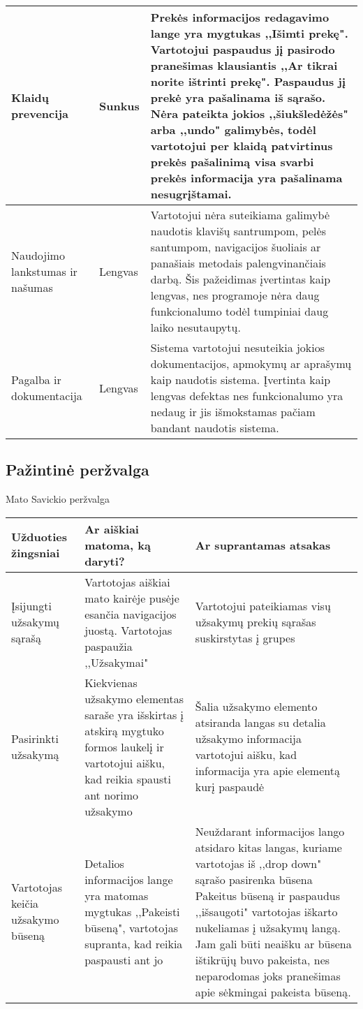 \documentclass[oneside]{VUMIFPSkursinis}
\begin{document}
\begin{center}
    \begin{tabular}{ |p{3cm}| p{3cm} | p{11cm} | }
	\hline
	Klaidų prevencija & Sunkus & Prekės informacijos redagavimo lange yra mygtukas ,,Išimti prekę". 
					Vartotojui paspaudus jį pasirodo pranešimas klausiantis ,,Ar tikrai norite ištrinti prekę". 
					Paspaudus jį prekė yra pašalinama iš sąrašo.
					Nėra pateikta jokios ,,šiukšledėžės" arba ,,undo" galimybės, todėl vartotojui per klaidą patvirtinus prekės pašalinimą visa svarbi prekės informacija yra pašalinama nesugrįštamai. \\ \hline
	Naudojimo lankstumas ir našumas & Lengvas & Vartotojui nėra suteikiama galimybė naudotis klavišų santrumpom, pelės santumpom, navigacijos šuoliais ar panašiais metodais palengvinančiais darbą.
								Šis pažeidimas įvertintas kaip lengvas, nes programoje nėra daug funkcionalumo todėl tumpiniai daug laiko nesutaupytų. \\ \hline
	Pagalba ir dokumentacija & Lengvas & Sistema vartotojui nesuteikia jokios dokumentacijos, apmokymų ar aprašymų kaip naudotis sistema. 
							Įvertinta kaip lengvas defektas nes funkcionalumo yra nedaug ir jis išmokstamas pačiam bandant naudotis sistema. \\ \hline
   \hline
    \end{tabular}
\end{center}
	\subsection{Pažintinė peržvalga}
Mato Savickio peržvalga
\begin{center}
    \begin{tabular}{ |p{4cm}| p{6cm} | p{7cm} | }
    \hline
    	Užduoties žingsniai & Ar aiškiai matoma, ką daryti? & Ar suprantamas atsakas \\ \hline 
	Įsijungti užsakymų sąrašą & Vartotojas aiškiai mato kairėje pusėje esančia navigacijos juostą.
					Vartotojas paspaužia ,,Užsakymai" & Vartotojui pateikiamas visų užsakymų prekių sąrašas suskirstytas į grupes \\ \hline
	Pasirinkti užsakymą & Kiekvienas užsakymo elementas saraše yra išskirtas į atskirą mygtuko formos laukelį ir vartotojui aišku, kad reikia spausti ant norimo užsakymo & Šalia užsakymo elemento atsiranda langas su detalia užsakymo informacija vartotojui aišku, kad informacija yra apie elementą kurį paspaudė \\ \hline
	Vartotojas keičia užsakymo būseną & Detalios informacijos lange yra matomas mygtukas ,,Pakeisti būseną", vartotojas supranta, kad reikia paspausti ant jo & Neuždarant informacijos lango atsidaro kitas langas, kuriame vartotojas iš ,,drop down" sąrašo pasirenka būsena  Pakeitus būseną ir paspaudus ,,išsaugoti" vartotojas iškarto nukeliamas į užsakymų langą.
Jam gali būti neaišku ar būsena ištikrūjų buvo pakeista, nes neparodomas joks pranešimas apie sėkmingai pakeista būseną. \\ \hline
	
   \hline
    \end{tabular}
\end{center}
\end{document}
